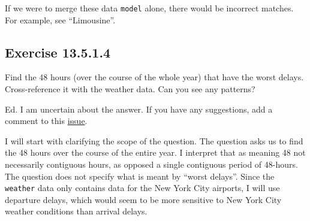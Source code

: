 \documentclass[]{book}
\newenvironment{Shaded}{\begin{snugshade}}{\end{snugshade}}
\newcommand{\CommentTok}[1]{\textcolor[rgb]{0.56,0.35,0.01}{\textit{#1}}}
\newcommand{\DecValTok}[1]{\textcolor[rgb]{0.00,0.00,0.81}{#1}}
\newcommand{\KeywordTok}[1]{\textcolor[rgb]{0.13,0.29,0.53}{\textbf{#1}}}
\newcommand{\NormalTok}[1]{#1}
\newcommand{\OperatorTok}[1]{\textcolor[rgb]{0.81,0.36,0.00}{\textbf{#1}}}
\newcommand{\StringTok}[1]{\textcolor[rgb]{0.31,0.60,0.02}{#1}}
\theoremstyle{plain}
\theoremstyle{remark}
\begin{document}
\begin{Shaded}
\end{Shaded}

If we were to merge these data \texttt{model} alone, there would be incorrect matches.
For example, see ``Limousine''.

\hypertarget{exercise-13.5.1.4}{%
\subsection*{\texorpdfstring{Exercise {13.5.1.4}}{Exercise 13.5.1.4}}\label{exercise-13.5.1.4}}

Find the 48 hours (over the course of the whole year) that have the worst delays.
Cross-reference it with the weather data. Can you see any patterns?

Ed. I am uncertain about the answer. If you have any suggestions, add a comment to
this \href{https://github.com/jrnold/r4ds-exercise-solutions/issues/135}{issue}.

I will start with clarifying the scope of the question.
The question asks us to find the 48 hours over the course of the entire year.
I interpret that as meaning 48 not necessarily contiguous hours, as opposed a single contiguous period of 48-hours.
The question does not specify what is meant by ``worst delays''.
Since the \texttt{weather} data only contains data for the New York City airports, I will use departure delays, which would seem to be more sensitive to New York City weather conditions than arrival delays.
\end{document}
